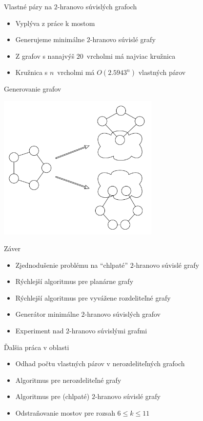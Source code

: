 \documentclass[slovak]{beamer}
\begin{document}
\begin{frame}{Vlastné páry na $2$-hranovo súvislých grafoch}
    \begin{itemize}
        \item Vyplýva z práce k mostom
        \item Generujeme minimálne $2$-hranovo súvislé grafy
        \item Z grafov s nanajvýš $20$ vrcholmi má najviac kružnica
        \item Kružnica s $n$ vrcholmi má $O(2.5943^n)$ vlastných párov
    \end{itemize}
\end{frame}

\begin{frame}{Generovanie grafov}
    \begin{center}
        \includegraphics[width=0.6\textwidth]{grafy/gengraph.pdf}
    \end{center}
\end{frame}

\begin{frame}{Záver}
    \begin{itemize}
        \item Zjednodušenie problému na ``chlpaté'' $2$-hranovo súvislé grafy
        \item Rýchlejší algoritmus pre planárne grafy
        \item Rýchlejší algoritmus pre vyvážene rozdeliteľné grafy
        \item Generátor minimálne $2$-hranovo súvislých grafov
        \item Experiment nad $2$-hranovo súvislými grafmi
    \end{itemize}
\end{frame}

\begin{frame}{Ďalšia práca v oblasti}
    \begin{itemize}
        \item Odhad počtu vlastných párov v nerozdeliteľných grafoch
        \item Algoritmus pre nerozdeliteľné grafy
        \item Algoritmus pre (chlpaté) $2$-hranovo súvislé grafy
        \item Odstraňovanie mostov pre rozsah $6 \leq k \leq 11$
    \end{itemize}
\end{frame}
\end{document}
